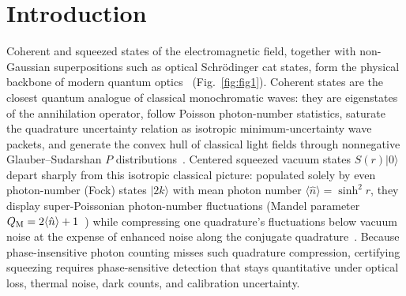 \documentclass{iopjournal}
\newcommand{\ket}[1]{\lvert #1\rangle}
\begin{document}
\section{Introduction}\label{sec:intro}

Coherent and squeezed states of the electromagnetic field, together with non-Gaussian superpositions such as optical Schr\"odinger cat states, form the physical backbone of modern quantum optics~\cite{Glauber1963,Sudarshan1963,ScullyZubairy1997,Loudon2000,GerryKnight2005,Ourjoumtsev2007,Lewenstein2021} (Fig.~\ref{fig:fig1}). Coherent states are the closest quantum analogue of classical monochromatic waves: they are eigenstates of the annihilation operator, follow Poisson photon-number statistics, saturate the quadrature uncertainty relation as isotropic minimum-uncertainty wave packets, and generate the convex hull of classical light fields through nonnegative Glauber--Sudarshan $P$ distributions~\cite{Glauber1963,Sudarshan1963,GerryKnight2005,ScullyZubairy1997,Loudon2000}. Centered squeezed vacuum states $S(r)\ket{0}$ depart sharply from this isotropic classical picture: populated solely by even photon-number (Fock) states $\ket{2k}$ with mean photon number $\langle\hat n\rangle = \sinh^2 r$, they display super-Poissonian photon-number fluctuations (Mandel parameter $Q_{\rm M} = 2\langle\hat n\rangle + 1$~\cite{Loudon2000,GerryKnight2005}) while compressing one quadrature's fluctuations below vacuum noise at the expense of enhanced noise along the conjugate quadrature~\cite{ScullyZubairy1997,Loudon2000,GerryKnight2005}. Because phase-insensitive photon counting misses such quadrature compression, certifying squeezing requires phase-sensitive detection that stays quantitative under optical loss, thermal noise, dark counts, and calibration uncertainty.
\end{document}
